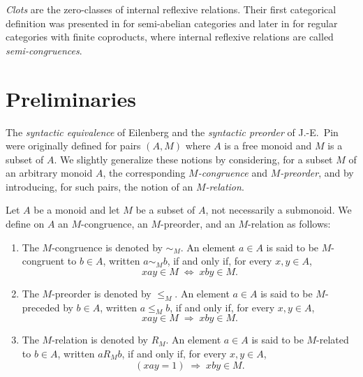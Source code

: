 \documentclass[12pt]{article}
\begin{document}
{\em Clots} are the zero-classes of internal reflexive relations. Their first categorical definition was presented in \cite{JMU} for semi-abelian categories and later in \cite{M} for regular categories with finite coproducts, where internal reflexive relations are called {\em semi-congruences}.


\section{Preliminaries}


The {\em syntactic equivalence} of Eilenberg \cite{E} and the {\em syntactic preorder} of J.-E.~Pin \cite{P,HP} were originally defined for pairs $(A,M)$ where $A$ is a free monoid and $M$ is a subset of $A$. We slightly generalize these notions by considering, for a subset $M$ of an arbitrary monoid $A$, the corresponding {\em $M$-congruence} and {\em $M$-preorder}, and by introducing, for such pairs, the notion of an {\em $M$-relation}.


Let $A$ be a monoid and let $M$ be a subset of $A$, not necessarily a submonoid. We define on $A$ an $M$-congruence, an $M$-preorder, and an $M$-relation as follows:
\begin{enumerate}
\item The $M$-congruence is denoted by $\sim_{M}$. An element $a\in A$ is said to be $M$-congruent to $b\in A$, written $a\sim_{M}b$, if and only if, for every $x,y\in A$,
\[
xay \in M \;\Leftrightarrow\; xby \in M.
\]

\item The $M$-preorder is denoted by $\leq_{M}$. An element $a\in A$ is said to be $M$-preceded by $b\in A$, written $a\leq_{M}b$, if and only if, for every $x,y\in A$,
\[
xay \in M \;\Rightarrow\; xby \in M.
\]

\item The $M$-relation is denoted by $R_{M}$. An element $a\in A$ is said to be $M$-related to $b\in A$, written $aR_{M}b$, if and only if, for every $x,y\in A$,
\[
(xay = 1) \;\Rightarrow\; xby \in M.
\]
\end{enumerate}
\end{document}
